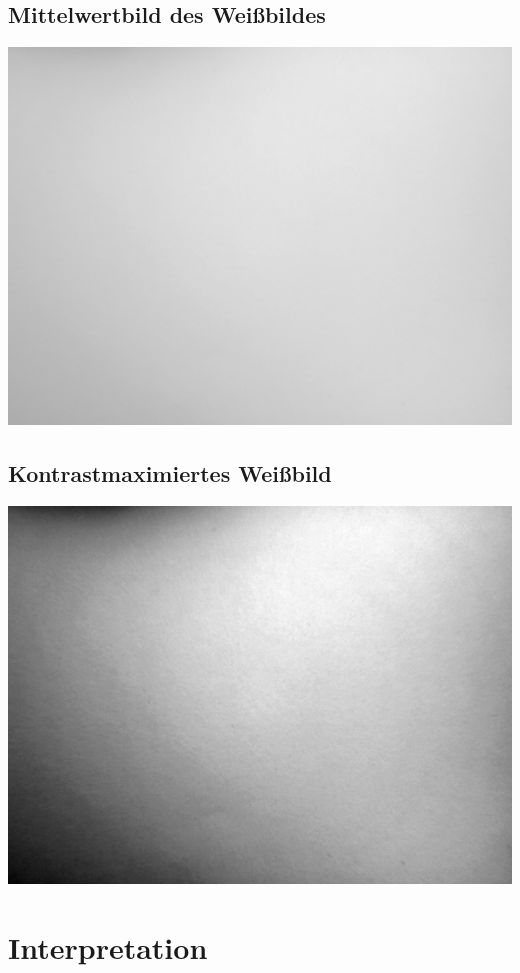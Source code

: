 \subsection*{Mittelwertbild des Weißbildes}
\includegraphics[scale=0.6]{media/weissMean.png}


\subsection*{Kontrastmaximiertes Weißbild}
\includegraphics[scale=0.6]{media/weissContrastMax.png}

\section{Interpretation}
\label{chap:VERSUCH_3_INTERPRETATION}
